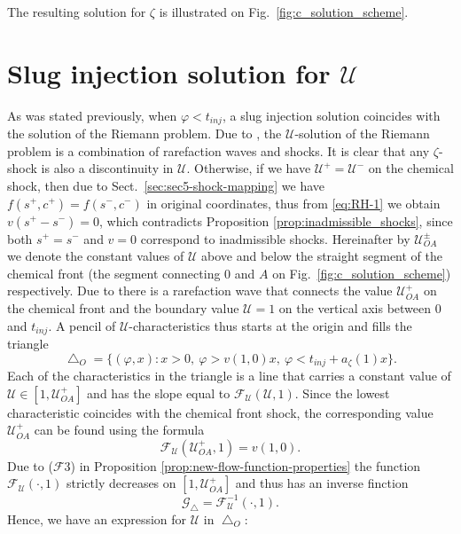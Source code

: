 \documentclass[12pt]{article}
\theoremstyle{definition}
\begin{document}
The resulting solution for $\zeta$ is illustrated on Fig.~\ref{fig:c_solution_scheme}.

\section{Slug injection solution for $\mathcal U$}
\label{sec:solution-U}

As was stated previously, when $\varphi < t_{inj}$, a slug injection solution coincides with the solution of the Riemann problem. Due to \cite{JnW}, the $\mathcal U$-solution of the Riemann problem is a combination of rarefaction waves and shocks. It is clear that 
any $\zeta$-shock is also a discontinuity in $\mathcal U$. Otherwise, if we have $\mathcal U^+ = \mathcal U^-$ on the chemical shock, then due to Sect.~\ref{sec:sec5-shock-mapping} we have $f(s^+, c^+) = f(s^-, c^-)$ in original coordinates, thus from \eqref{eq:RH-1} we obtain $v(s^+ - s^-) = 0$, which contradicts Proposition \ref{prop:inadmissible_shocks}, since both $s^+ = s^-$ and $v=0$ correspond to inadmissible shocks. Hereinafter by $\mathcal U^{\pm}_{OA}$ we denote the constant values of $\mathcal U$ above and below the straight segment of the chemical front (the segment connecting $0$ and $A$ on Fig.~\ref{fig:c_solution_scheme}) respectively. 
Due to \cite{JnW} there is a rarefaction wave that connects the value $\mathcal U^+_{OA}$ on the chemical front and the boundary value $\mathcal U = 1$ on the vertical axis between $0$ and $t_{inj}$.
A pencil of $\mathcal U$-characteristics thus starts at the origin and fills the triangle 
$$\bigtriangleup_O = \{(\varphi, x)\colon x > 0,\ \varphi > v(1, 0) x,\ \varphi < t_{inj} + a_\zeta(1) x\}.$$ 
Each of the characteristics in the triangle is a line that carries a constant value of $\mathcal U\in [1, \mathcal U^+_{OA}]$ and has the slope equal to $\mathcal F_{\mathcal U}(\mathcal U, 1)$. 
Since the lowest characteristic coincides with the chemical front shock, the corresponding value $\mathcal U^+_{OA}$ can be found using the formula 
\begin{equation}
\label{eq:U+_cf}
\mathcal F_{\mathcal U}(\mathcal U^+_{OA}, 1) = v(1, 0).
\end{equation}
Due to ($\mathcal F$3) in Proposition \ref{prop:new-flow-function-properties} the function $\mathcal F_{\mathcal U}(\cdot, 1)$ strictly decreases on $[1, \mathcal U^+_{OA}]$ and thus has an inverse finction
\[\mathcal G_\bigtriangleup = \mathcal F_{\mathcal U}^{-1}(\cdot, 1).\]
Hence, we have an expression for $\mathcal U$ in $\bigtriangleup_O$:
\end{document}
